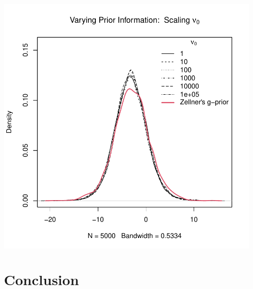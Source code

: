 \documentclass[12pt, a4paper]{article}
\begin{document}
\includegraphics{Thesis-021}

\clearpage

\section{Conclusion}
\end{document}
